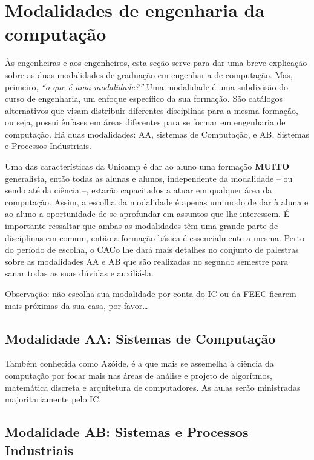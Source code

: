
\section{Modalidades de engenharia da computação}

Às engenheiras e aos engenheiros, esta seção serve para dar uma breve
explicação sobre as duas modalidades de graduação em engenharia de computação.
Mas, primeiro, {\emph{``o que é uma modalidade?''}} Uma modalidade é uma
subdivisão do curso de engenharia, um enfoque específico da sua formação. São
catálogos alternativos que visam distribuir diferentes disciplinas para a mesma
formação, ou seja, possui ênfases em áreas diferentes para se formar em
engenharia de computação. Há duas modalidades: AA, sistemas de Computação, e
AB, Sistemas e Processos Industriais.

Uma das características da Unicamp é dar ao aluno uma formação \textbf{MUITO}
generalista, então todas as alunas e alunos, independente da modalidade -- ou
sendo até da ciência --, estarão capacitados a atuar em qualquer área da
computação. Assim, a escolha da modalidade é apenas um modo de dar à aluna e ao
aluno a oportunidade de se aprofundar em assuntos que lhe interessem. É
importante ressaltar que ambas as modalidades têm uma grande parte de
disciplinas em comum, então a formação básica é essencialmente a mesma. Perto
do período de escolha, o CACo lhe dará mais detalhes no conjunto de palestras
sobre as modalidades AA e AB que são realizadas no segundo semestre para sanar
todas as suas dúvidas e auxiliá-la.

Observação: não escolha sua modalidade por conta do IC ou da FEEC ficarem mais
próximas da sua casa, por favor{\dots}

\subsection{Modalidade AA: Sistemas de Computação}

Também conhecida como Azóide, é a que mais se assemelha à ciência da computação
por focar mais nas áreas de análise e projeto de algorítmos, matemática
discreta e arquitetura de computadores. As aulas serão ministradas
majoritariamente pelo IC.

\subsection{Modalidade AB: Sistemas e Processos Industriais}

